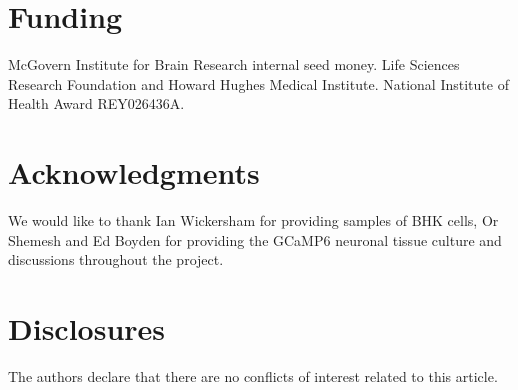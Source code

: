 \documentclass[10pt]{article}
\begin{document}
\newpage

\section*{Funding}
McGovern Institute for Brain Research internal seed money.
Life Sciences Research Foundation and Howard Hughes Medical Institute.
National Institute of Health Award REY026436A.  

\section*{Acknowledgments}
We would like to thank Ian Wickersham for providing samples of BHK cells, Or Shemesh and Ed Boyden for providing the GCaMP6 neuronal tissue culture and discussions throughout the project.

\section*{Disclosures}
The authors declare that there are no conflicts of interest related to this article.
\end{document}
